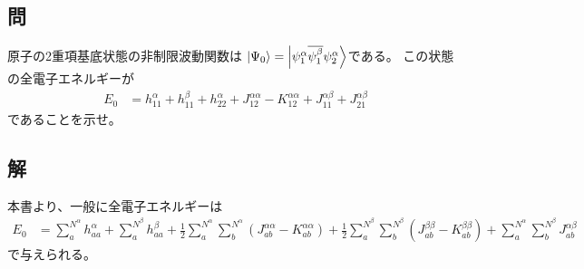 \subsection{問}
原子の2重項基底状態の非制限波動関数は
$\ket{\Psi_0}=\Ket{{\psi^\alpha_1}{\overline{\psi^\beta_1}}{\psi^\alpha_2}}$である。
この状態の全電子エネルギーが
\begin{align}
	E_0
&=
	h^\alpha_{11}
	+
	h^\beta_{11}
	+
	h^\alpha_{22}
	+
	J^{\alpha\alpha}_{12}
	-
	K^{\alpha\alpha}_{12}
	+
	J^{\alpha\beta}_{11}
	+
	J^{\alpha\beta}_{21}
\end{align}
であることを示せ。

\subsection{解}
本書より、一般に全電子エネルギーは
\begin{align}
	E_0
&=
	\sum_a^{N^\alpha}
		h^\alpha_{aa}
	+
	\sum_a^{N^\beta}
		h^\beta_{aa}
	+
	\frac{1}{2}
	\sum_a^{N^\alpha}
	\sum_b^{N^\alpha}\left(
		J^{\alpha\alpha}_{ab}
		-
		K^{\alpha\alpha}_{ab}
	\right)
	+
	\frac{1}{2}
	\sum_a^{N^\beta}
	\sum_b^{N^\beta}\left(
		J^{\beta\beta}_{ab}
		-
		K^{\beta\beta}_{ab}
	\right)
	+
	\sum_a^{N^\alpha}
	\sum_b^{N^\beta}
		J^{\alpha\beta}_{ab}
\end{align}
で与えられる。

